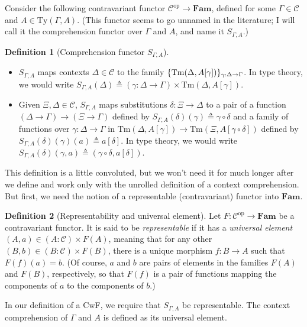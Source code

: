 \documentclass{article}
\renewcommand{\_}{\textrm{\textscale{.5}{\textunderscore}}}
\DeclarePairedDelimiter{\set}{\{}{\}}
\newcommand{\op}[1]{#1^{\mathrm{op}}}
\newcommand{\cat}[1]{\textbf{#1}}
\newcommand{\Tm}{\mathrm{Tm}}
\newcommand{\Ty}{\mathrm{Ty}}
\newcommand{\Pair}[3]{(#1 \mathbin{:} #2) \mathrel{\times} #3}
\theoremstyle{definition}
\newtheorem{definition}{Definition}[section]
\theoremstyle{plain}
\begin{document}
Consider the following contravariant functor $\op{\mathcal{C}} \to \cat{Fam}$, defined for some $\Gamma \in \mathcal{C}$ and $A \in \Ty(\Gamma, A)$.
(This functor seems to go unnamed in the literature; I will call it the comprehension functor over $\Gamma$ and $A$,
and name it $S_{\Gamma, A}$.)

\begin{definition}[Comprehension functor $S_{\Gamma, A}$] \leavevmode
\begin{itemize}
    \item $S_{\Gamma, A}$ maps contexts $\Delta \in \mathcal{C}$ to the family $\set{\Tm(\Delta, A[\gamma])}_{\gamma : \Delta \to \Gamma}$.
    In type theory, we would write $S_{\Gamma, A}(\Delta) \triangleq \Pair{\gamma}{\Delta \to \Gamma}{\Tm(\Delta, A[\gamma])}$.
    \item Given $\Xi, \Delta \in \mathcal{C}$, $S_{\Gamma, A}$ maps substitutions $\delta : \Xi \to \Delta$
    to a pair of a function $(\Delta \to \Gamma) \to (\Xi \to \Gamma)$
    defined by $S_{\Gamma, A}(\delta)(\gamma) \triangleq \gamma \circ \delta$
    and a family of functions over $\gamma : \Delta \to \Gamma$ in $\Tm(\Delta, A[\gamma]) \to \Tm(\Xi, A[\gamma \circ \delta])$ defined by $S_{\Gamma, A}(\delta)(\gamma)(a) \triangleq a[\delta]$.
    In type theory, we would write $S_{\Gamma, A}(\delta)(\gamma, a) \triangleq (\gamma \circ \delta, a[\delta])$.
\end{itemize}
\end{definition}

This definition is a little convoluted, but we won't need it for much longer after we define and work only with the unrolled definition of a context comprehension.
But first, we need the notion of a representable (contravariant) functor into $\cat{Fam}$.

\begin{definition}[Representability and universal element]
Let $F : \op{\mathcal{C}} \to \cat{Fam}$ be a contravariant functor.
It is said to be \emph{representable} if it has a \emph{universal element}
$(A, a) \in \Pair{A}{\mathcal{C}}{F(A)}$, meaning that
for any other $(B, b) \in \Pair{B}{\mathcal{C}}{F(B)}$,
there is a unique morphism $f : B \to A$
such that $F(f)(a) = b$.
(Of course, $a$ and $b$ are pairs of elements in the families $F(A)$ and $F(B)$, respectively,
so that $F(f)$ is a pair of functions mapping the components of $a$ to the components of $b$.)
\end{definition}

In our definition of a CwF, we require that $S_{\Gamma, A}$ be representable.
The context comprehension of $\Gamma$ and $A$ is defined as its universal element.
\end{document}
